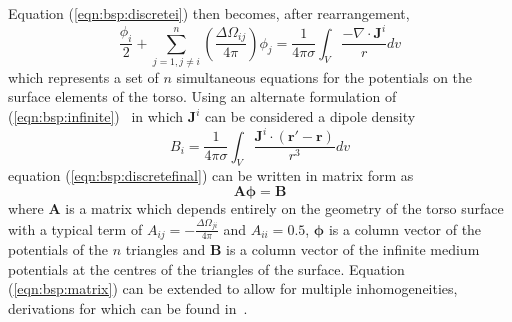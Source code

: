 Equation (\ref{eqn:bsp:discretei}) then becomes, after rearrangement,
\begin{equation}
\label{eqn:bsp:discretefinal}
\frac{\phi_{i}}{2} + \sum_{j=1,j \neq i}^n \left(\frac{\Delta\Omega_{ij}}{4\pi} \right)\phi_{j} =
\frac{1}{4 \pi \sigma}\int_{V} \frac{-\nabla \cdot \mathbf{J}^{i}}{r}dv
\end{equation}
which represents a set of $n$ simultaneous equations for the potentials on the
surface elements of the torso.
Using an alternate formulation of (\ref{eqn:bsp:infinite})~\cite{Plonsey1989} in
which $\mathbf{J}^i$ can be considered a dipole density
\begin{equation}
\label{eqn:bsp:b}
B_i = \frac{1}{4 \pi \sigma}\int_{V} \frac{\mathbf{J}^{i}\cdot
\left(\mathbf{r'}-\mathbf{r}\right)}{r^3}dv
\end{equation}
equation (\ref{eqn:bsp:discretefinal}) can be written in matrix form as
\begin{equation}
\label{eqn:bsp:matrix}
\mathbf{A}\mathbf{\phi} = \mathbf{B}
\end{equation}
where $\mathbf{A}$ is a matrix which depends entirely on the geometry of the
torso surface with a typical term of $\displaystyle A_{ij} =
-\frac{\Delta\Omega_{ji}}{4\pi}$ and $A_{ii} = 0.5$, $\mathbf{\phi}$ is a column
vector of the potentials of the $n$ triangles and $\mathbf{B}$ is a column
vector of the infinite medium potentials at the centres of the triangles of the
surface.
Equation (\ref{eqn:bsp:matrix}) can be extended to allow for multiple
inhomogeneities, derivations for which can be found
in~\cite{Barr1966,Geselowitz1968,Geselowitz1970,Gulrajani1983,Gulrajani1989}.

